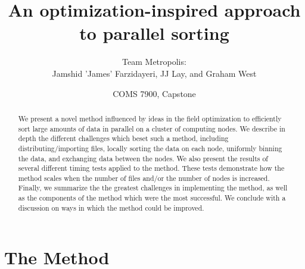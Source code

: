 \documentclass{article}
\begin{document}
\title{An optimization-inspired approach to parallel sorting}
\author{Team Metropolis: \\
		Jamshid 'James' Farzidayeri, JJ Lay, and Graham West}
\date{COMS 7900, Capstone}

\maketitle

\begin{abstract}
We present a novel method influenced by ideas in the field optimization to efficiently sort large amounts of data in parallel on a cluster of computing nodes. We describe in depth the different challenges which beset such a method, including distributing/importing files, locally sorting the data on each node, uniformly binning the data, and exchanging data between the nodes. We also present the results of several different timing tests applied to the method. These tests demonstrate how the method scales when the number of files and/or the number of nodes is increased. Finally, we summarize the the greatest challenges in implementing the method, as well as the components of the method which were the most successful. We conclude with a discussion on ways in which the method could be improved.
\end{abstract}


\tableofcontents


\section{The Method}
\end{document}

